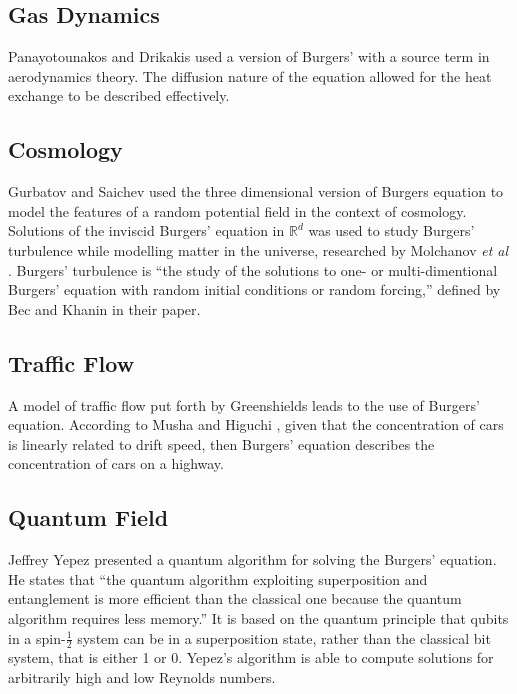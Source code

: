 \documentclass[undefended]{sfuthesis}
\begin{document}
\subsection{Gas Dynamics}

Panayotounakos and Drikakis \cite{gasDynamics} used a version of Burgers' with a source term in aerodynamics theory. The diffusion nature of the equation allowed for the heat exchange to be described effectively.

\subsection{Cosmology}

Gurbatov and Saichev \cite{cosmology} used the three dimensional version of Burgers equation to model the features of a random potential field in the context of cosmology. Solutions of the inviscid Burgers' equation in $\mathbb{R}^d$ was used to study Burgers' turbulence while modelling matter in the universe, researched by Molchanov \textit{et al} \cite{cosmology2}. Burgers' turbulence is ``the study of the solutions to one- or multi-dimentional Burgers' equation with random initial conditions or random forcing,'' defined by Bec and Khanin \cite{turbulence} in their paper.

\subsection{Traffic Flow}

A model of traffic flow put forth by Greenshields \cite{traffic} leads to the use of Burgers' equation. According to Musha and Higuchi \cite{traffic2}, given that the concentration of cars is linearly related to drift speed, then Burgers' equation describes the concentration of cars on a highway. 

\subsection{Quantum Field}

Jeffrey Yepez \cite{quantum} presented a quantum algorithm for solving the Burgers' equation. He states that ``the quantum algorithm exploiting superposition and entanglement is more efficient than the classical one because the quantum algorithm requires less memory.'' It is based on the quantum principle that qubits in a spin-$\frac{1}{2}$ system can be in a superposition state, rather than the classical bit system, that is either 1 or 0. Yepez's algorithm is able to compute solutions for arbitrarily high and low Reynolds numbers.
\end{document}
